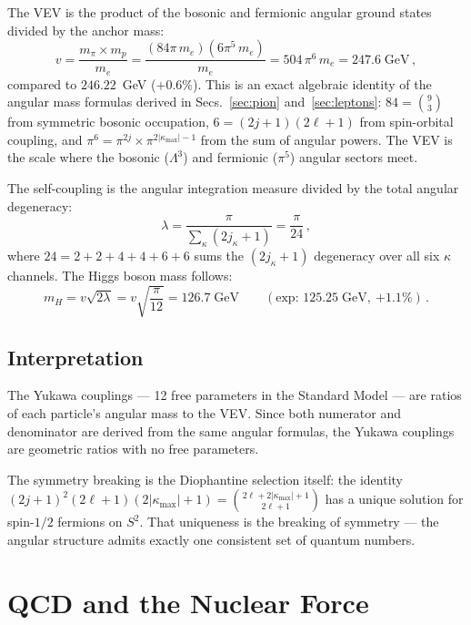 \documentclass[aps,prd,twocolumn,superscriptaddress,nofootinbib,longbibliography]{revtex4-2}
\newcommand{\kmax}{|\kappa_{\mathrm{max}}|}
\begin{document}
The VEV is the product of the bosonic and fermionic angular ground
states divided by the anchor mass:
\begin{equation}\label{eq:higgs-vev}
  v = \frac{m_\pi \times m_p}{m_e}
  = \frac{(84\pi\,m_e)(6\pi^5\,m_e)}{m_e}
  = 504\,\pi^6\,m_e = 247.6\;\text{GeV}\,,
\end{equation}
compared to $246.22$~GeV ($+0.6\%$).  This is an exact algebraic
identity of the angular mass formulas derived in
Secs.~\ref{sec:pion} and~\ref{sec:leptons}: $84 = \binom{9}{3}$
from symmetric bosonic occupation, $6 = (2j+1)(2\ell+1)$ from
spin-orbital coupling, and
$\pi^6 = \pi^{2j} \times \pi^{2\kmax-1}$ from the sum of angular
powers.  The VEV is the scale where the bosonic ($\Lambda^3$) and
fermionic ($\pi^5$) angular sectors meet.

The self-coupling is the angular integration measure divided by the
total angular degeneracy:
\begin{equation}\label{eq:higgs-lambda}
  \lambda = \frac{\pi}{\sum_\kappa (2j_\kappa+1)}
  = \frac{\pi}{24}\,,
\end{equation}
where $24 = 2+2+4+4+6+6$ sums the $(2j_\kappa+1)$ degeneracy over
all six $\kappa$ channels.  The Higgs boson mass follows:
\begin{equation}\label{eq:higgs-mass}
  m_H = v\sqrt{2\lambda} = v\sqrt{\frac{\pi}{12}}
  = 126.7\;\text{GeV}
  \qquad(\text{exp: }125.25\;\text{GeV},\ {+1.1\%})\,.
\end{equation}

\subsection{Interpretation}

The Yukawa couplings --- 12 free parameters in the Standard Model ---
are ratios of each particle's angular mass to the VEV.  Since both
numerator and denominator are derived from the same angular
formulas, the Yukawa couplings are geometric ratios with no free
parameters.

The symmetry breaking is the Diophantine selection itself: the
identity $(2j+1)^2(2\ell+1)(2\kmax+1) = \binom{2\ell+2\kmax+1}{2\ell+1}$
has a unique solution for spin-$1/2$ fermions on $S^2$.  That
uniqueness is the breaking of symmetry --- the angular structure
admits exactly one consistent set of quantum numbers.

\section{QCD and the Nuclear Force}\label{sec:nuclear}
\end{document}
